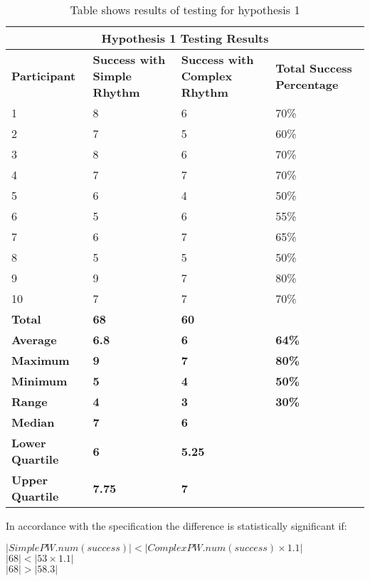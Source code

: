 \documentclass{article}
\begin{document}
{
\begin{table} [H]
\centering
\begin{tabular}{ |p{2cm}|p{4cm}|p{4cm}| p{4cm} | }
\hline
\multicolumn{4}{|c|}{\textbf{Hypothesis 1 Testing Results}} \\
\hline
\textbf{Participant} & \textbf{Success with Simple Rhythm} & \textbf{Success with Complex Rhythm} & \textbf{Total Success Percentage} \\
\hline
1 & 8 & 6 & 70\% \\
\hline
2 & 7 & 5 & 60\% \\
\hline
3 & 8 & 6 & 70\% \\
\hline
4 & 7 & 7 & 70\%  \\
\hline
5 & 6 & 4 & 50\% \\
\hline
6 & 5 & 6 & 55\% \\
\hline
7 & 6 & 7 & 65\% \\
\hline
8 & 5 & 5 & 50\% \\
\hline
9 & 9 & 7 & 80\% \\
\hline
10 & 7 & 7 & 70\% \\
\hline
\textbf{Total} & \textbf{68} & \textbf{60} & \\
\hline
\textbf{Average} & \textbf{6.8} & \textbf{6} & \textbf{64\%} \\
\hline
\textbf{Maximum} & \textbf{9} & \textbf{7} & \textbf{80\%} \\
\hline
\textbf{Minimum} & \textbf{5} & \textbf{4} & \textbf{50\%} \\
\hline
\textbf{Range} & \textbf{4} & \textbf{3} & \textbf{30\%} \\
\hline
\textbf{Median} & \textbf{7} & \textbf{6} & \\
\hline
\textbf{Lower Quartile} & \textbf{6} & \textbf{5.25} & \\
\hline
\textbf{Upper Quartile} & \textbf{7.75} & \textbf{7} & \\
\hline
\end{tabular}
\caption{Table shows results of testing for hypothesis 1}
\label{table:1}
\end{table}
}

In accordance with the specification the difference is statistically significant if: 
\begin{center}
    $ |SimplePW.num(success)| < |ComplexPW.num(success) \times 1.1|$ \\
    $ |68| < |53 \times 1.1| $ \\
    $ |68| > |58.3| $
\end{center}
\end{document}
